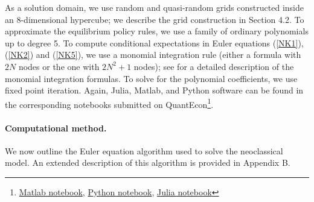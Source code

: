 As a solution domain, we use random and quasi-random grids constructed inside
an 8-dimensional hypercube; we describe the grid construction in Section 4.2.
To approximate the equilibrium policy rules, we use a family of ordinary
polynomials up to degree 5. To compute conditional expectations in Euler
equations (\ref{NK1}), (\ref{NK2}) and (\ref{NK5}), we use a monomial
integration rule (either a formula with $2N$ nodes or the one with $2N^{2}+1$
nodes); see \cite{JMM2011} for a detailed description of the monomial
integration formulas. To solve for the polynomial coefficients, we use fixed
point iteration. Again, Julia, Matlab, and Python software can be found in the
corresponding notebooks submitted on QuantEcon\footnote{
\href{http://notes.quantecon.org/submission/5b53cd9117fb4900153deafe}{Matlab notebook},
\href{http://notes.quantecon.org/submission/5b53cdaf17fb4900153deaff}{Python notebook},
\href{http://notes.quantecon.org/submission/5b53cd6917fb4900153deafd}{Julia notebook}}.



\paragraph{Computational method.}

We now outline the Euler equation algorithm used to solve the neoclassical
model. An extended description of this algorithm is provided in Appendix B.

